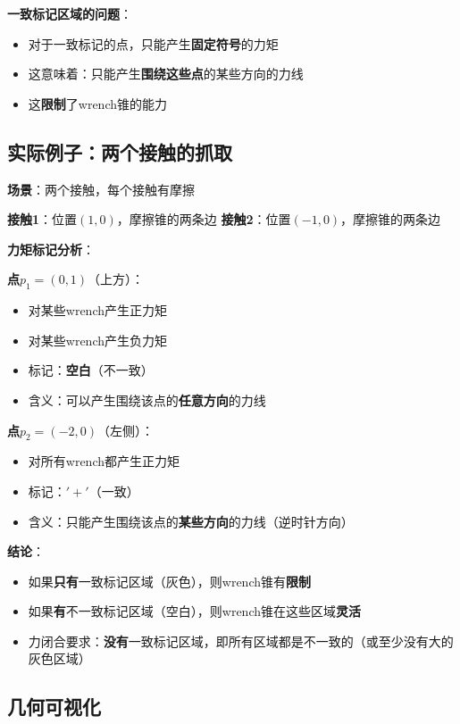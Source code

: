 \documentclass[12pt,a4paper]{article}
\begin{document}
\textbf{一致标记区域的问题}：
\begin{itemize}
\item 对于一致标记的点，只能产生\textbf{固定符号}的力矩
\item 这意味着：只能产生\textbf{围绕这些点}的某些方向的力线
\item 这\textbf{限制}了wrench锥的能力
\end{itemize}

\subsection{实际例子：两个接触的抓取}

\textbf{场景}：两个接触，每个接触有摩擦

\textbf{接触1}：位置$(1, 0)$，摩擦锥的两条边
\textbf{接触2}：位置$(-1, 0)$，摩擦锥的两条边

\textbf{力矩标记分析}：

\textbf{点$p_1 = (0, 1)$}（上方）：
\begin{itemize}
\item 对某些wrench产生正力矩
\item 对某些wrench产生负力矩
\item 标记：\textbf{空白}（不一致）
\item 含义：可以产生围绕该点的\textbf{任意方向}的力线
\end{itemize}

\textbf{点$p_2 = (-2, 0)$}（左侧）：
\begin{itemize}
\item 对所有wrench都产生正力矩
\item 标记：$'+'$（一致）
\item 含义：只能产生围绕该点的\textbf{某些方向}的力线（逆时针方向）
\end{itemize}

\textbf{结论}：
\begin{itemize}
\item 如果\textbf{只有}一致标记区域（灰色），则wrench锥有\textbf{限制}
\item 如果\textbf{有}不一致标记区域（空白），则wrench锥在这些区域\textbf{灵活}
\item 力闭合要求：\textbf{没有}一致标记区域，即所有区域都是不一致的（或至少没有大的灰色区域）
\end{itemize}

\subsection{几何可视化}
\end{document}
